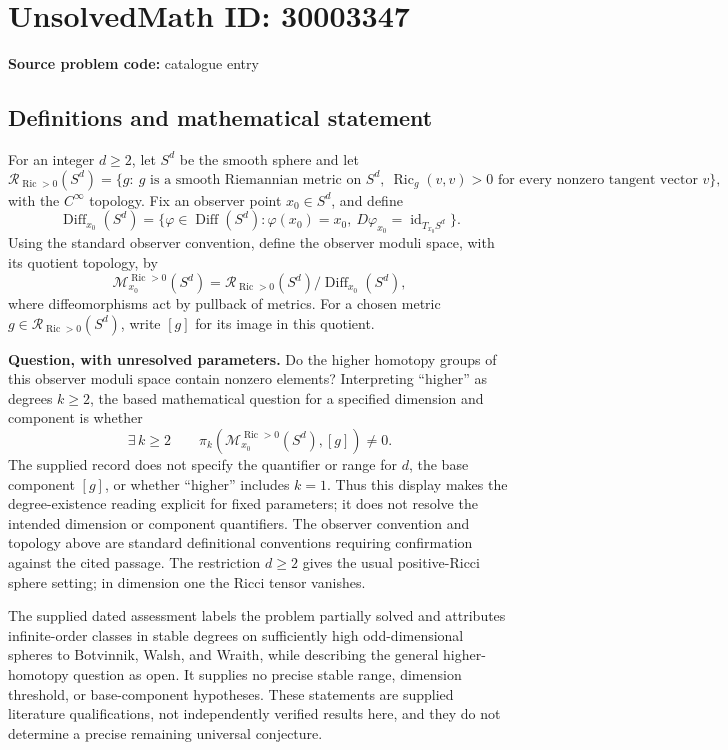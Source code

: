 \documentclass[11pt]{article}
\begin{document}
\section*{UnsolvedMath ID: 30003347}
\textbf{Source problem code:} catalogue entry
\subsection{Definitions and mathematical statement}
For an integer \(d\geq 2\), let \(S^d\) be the smooth sphere and let
\[
\mathcal R_{\operatorname{Ric}>0}(S^d)
=\{g:\ g\text{ is a smooth Riemannian metric on }S^d,\ \operatorname{Ric}_g(v,v)>0\text{ for every nonzero tangent vector }v\},
\]
with the \(C^\infty\) topology. Fix an observer point \(x_0\in S^d\), and define
\[
\operatorname{Diff}_{x_0}(S^d)
=\{\varphi\in\operatorname{Diff}(S^d):\varphi(x_0)=x_0,\ D\varphi_{x_0}=\operatorname{id}_{T_{x_0}S^d}\}.
\]
Using the standard observer convention, define the observer moduli space, with its quotient topology, by
\[
\mathcal M^{\operatorname{Ric}>0}_{x_0}(S^d)
=\mathcal R_{\operatorname{Ric}>0}(S^d)/\operatorname{Diff}_{x_0}(S^d),
\]
where diffeomorphisms act by pullback of metrics. For a chosen metric \(g\in\mathcal R_{\operatorname{Ric}>0}(S^d)\), write \([g]\) for its image in this quotient.

\textbf{Question, with unresolved parameters.} Do the higher homotopy groups of this observer moduli space contain nonzero elements? Interpreting ``higher'' as degrees \(k\geq 2\), the based mathematical question for a specified dimension and component is whether
\[
\exists\,k\geq 2\qquad
\pi_k\!\left(\mathcal M^{\operatorname{Ric}>0}_{x_0}(S^d),[g]\right)\neq 0.
\]
The supplied record does not specify the quantifier or range for \(d\), the base component \([g]\), or whether ``higher'' includes \(k=1\). Thus this display makes the degree-existence reading explicit for fixed parameters; it does not resolve the intended dimension or component quantifiers. The observer convention and topology above are standard definitional conventions requiring confirmation against the cited passage. The restriction \(d\geq 2\) gives the usual positive-Ricci sphere setting; in dimension one the Ricci tensor vanishes.

The supplied dated assessment labels the problem partially solved and attributes infinite-order classes in stable degrees on sufficiently high odd-dimensional spheres to Botvinnik, Walsh, and Wraith, while describing the general higher-homotopy question as open. It supplies no precise stable range, dimension threshold, or base-component hypotheses. These statements are supplied literature qualifications, not independently verified results here, and they do not determine a precise remaining universal conjecture.
\end{document}

